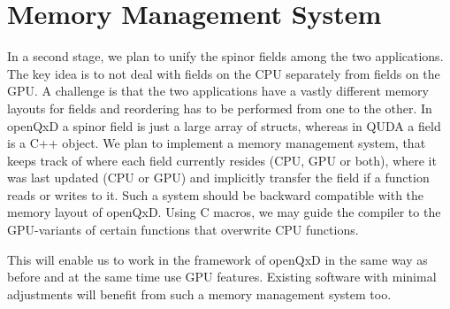 \chapter{Memory Management System}
\label{ch:p1:memory}

In a second stage, we plan to unify the spinor fields among the two applications. The key idea is to not deal with fields on the CPU separately from fields on the GPU. A challenge is that the two applications have a vastly different memory layouts for fields and reordering has to be performed from one to the other. In openQxD a spinor field is just a large array of structs, whereas in QUDA a field is a C++ object. We plan to implement a memory management system, that keeps track of where each field currently resides (CPU, GPU or both), where it was last updated (CPU or GPU) and implicitly transfer the field if a function reads or writes to it. Such a system should be backward compatible with the memory layout of openQxD. Using C macros, we may guide the compiler to the GPU-variants of certain functions that overwrite CPU functions.

This will enable us to work in the framework of openQxD in the same way as before and at the same time use GPU features. 
Existing software with minimal adjustments will benefit from such a memory management system too.

